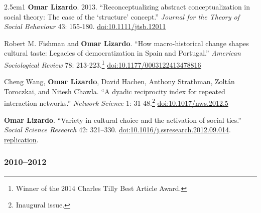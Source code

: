 \documentclass[
]{article}
\newenvironment{cventry}{\begin{hangparas}{2.5em}{1}}{\end{hangparas}}
\begin{document}
\begin{cventry}
\textbf{Omar Lizardo}. 2013. ``Reconceptualizing abstract
conceptualization in social theory: The case of the `structure'
concept.'' \emph{Journal for the Theory of Social Behaviour} 43:
155-180.
\href{https://doi.org/10.1111/jtsb.12011}{doi:10.1111/jtsb.12011}

Robert M. Fishman and \textbf{Omar Lizardo}. ``How macro-historical
change shapes cultural taste: Legacies of democratization in Spain and
Portugal.'' \emph{American Sociological Review} 78: 213-223.\footnote{Winner
  of the 2014 Charles Tilly Best Article Award.}
\href{https://doi.org/10.1177/0003122413478816}{doi:10.1177/0003122413478816}

Cheng Wang, \textbf{Omar Lizardo}, David Hachen, Anthony Strathman,
Zoltán Toroczkai, and Nitesh Chawla. ``A dyadic reciprocity index for
repeated interaction networks.'' \emph{Network Science} 1:
31-48.\footnote{Inaugural issue.}
\href{https://doi.org/10.1017/nws.2012.5}{doi:10.1017/nws.2012.5}

\textbf{Omar Lizardo}. ``Variety in cultural choice and the activation
of social ties.'' \emph{Social Science Research} 42: 321--330.
\href{https://doi.org/10.1016/j.ssresearch.2012.09.014}{doi:10.1016/j.ssresearch.2012.09.014}.
\href{https://github.com/olizardo/replication-cultural-capital-network-activation}{
replication}.

\end{cventry}

\subsubsection{2010--2012}\label{section-9}
\end{document}
